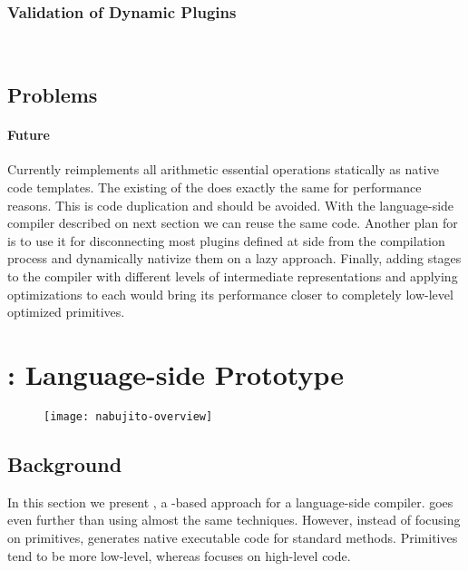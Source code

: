 \subsubsection*{Validation of Dynamic Plugins}

\\


\subsection{Problems}
\paragraph{\WF Future}
Currently \WF reimplements all \Slang arithmetic essential operations statically as native code templates.
The existing \JIT of the \PH \VM does exactly the same for performance reasons.
This is code duplication and should be avoided.
With the language-side \JIT compiler described on next section we can reuse the same code. Another plan for \WF is to use it for disconnecting most plugins defined at \Slang side from the \VM compilation process and dynamically nativize them on a lazy approach.
Finally, adding stages to the compiler with different levels of intermediate representations and applying optimizations to each would bring its performance closer to completely low-level optimized primitives.


\section{\NBJ: Language-side \JIT Prototype}

\begin{figure}[h]
	\centering
	\texttt{[image: nabujito-overview]}
\end{figure}

\subsection{Background}
In this section we present \NBJ, a \B-based approach for a language-side \JIT compiler.
\NBJ goes even further than \WF using almost the same techniques.
However, instead of focusing on primitives, \NBJ generates native executable code for standard \ST methods.
Primitives tend to be more low-level, whereas \NBJ focuses on high-level \ST code. 


